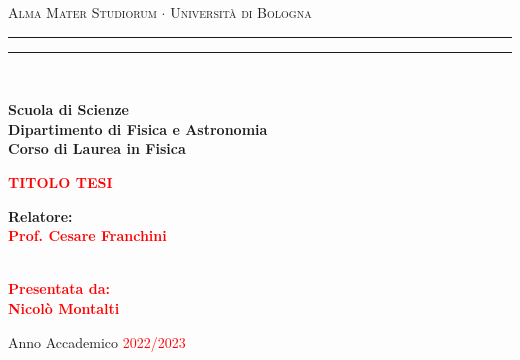 \begin{titlepage}
    \begin{center}
        {{\Large{\textsc{Alma Mater Studiorum $\cdot$ Universit\`a di Bologna}}}}
        \rule[0.1cm]{15.8cm}{0.1mm}
        \rule[0.5cm]{15.8cm}{0.6mm}
        \\\vspace{3mm}

        {\small{\bf Scuola di Scienze \\
                Dipartimento di Fisica e Astronomia\\
                Corso di Laurea in Fisica}}

    \end{center}

    \vspace{23mm}

    \begin{center}\textcolor{red}{
            {\LARGE{\bf TITOLO TESI}}\\
        }\end{center}

    \vspace{50mm} \par \noindent

    \begin{minipage}[t]{0.47\textwidth}
        {\large{\bf Relatore: \vspace{2mm}\\\textcolor{red}{
                    Prof. Cesare Franchini}\\\\
            }}
    \end{minipage}
    \hfill
    \begin{minipage}[t]{0.47\textwidth}\raggedleft \textcolor{red}
        {\large{\bf Presentata da:
                \vspace{2mm}\\
                Nicolò Montalti}}
    \end{minipage}

    \vspace{40mm}

    \begin{center}
        Anno Accademico \textcolor{red}{ 2022/2023}
    \end{center}

\end{titlepage}